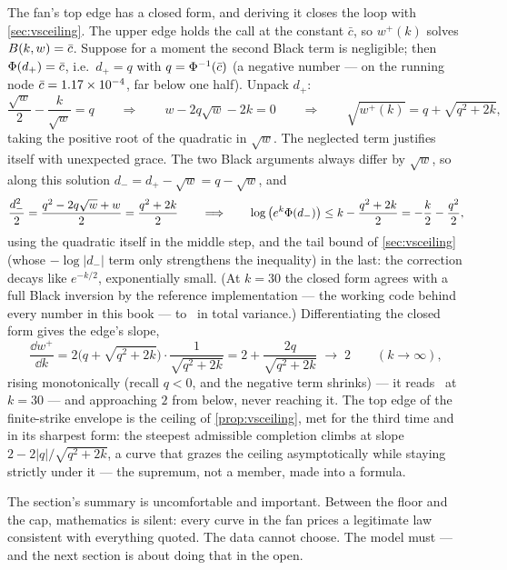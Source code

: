 The fan's top edge has a closed form, and deriving it closes the loop
with \cref{sec:vsceiling}.  The upper edge holds the call at the
constant $\bar c$, so $w^{+}(k)$ solves
$B(k,w)=\bar c$.  Suppose for a moment the second Black term is
negligible; then $\Phi(d_{+})=\bar c$, i.e.\
$d_{+}=q$ with $q=\Phi^{-1}(\bar c)$ (a negative number --- on the
running node $\bar c=1.17\times10^{-4}$, far below one half).  Unpack
$d_{+}$:
\[
\frac{\sqrt w}{2}-\frac{k}{\sqrt w}=q
\qquad\Longrightarrow\qquad
w-2q\sqrt w-2k=0
\qquad\Longrightarrow\qquad
\sqrt{w^{+}(k)}=q+\sqrt{q^{2}+2k},
\]
taking the positive root of the quadratic in $\sqrt w$.  The neglected
term justifies itself with unexpected grace.  The two Black arguments
always differ by $\sqrt w$, so along this solution
$d_{-}=d_{+}-\sqrt w=q-\sqrt{w}$, and
\[
\frac{d_{-}^{2}}{2}
=\frac{q^{2}-2q\sqrt w+w}{2}
=\frac{q^{2}+2k}{2}
\qquad\Longrightarrow\qquad
\log\big(e^{k}\Phi(d_{-})\big)
\le k-\frac{q^{2}+2k}{2}
=-\frac{k}{2}-\frac{q^{2}}{2},
\]
using the quadratic itself in the middle step, and the tail bound of
\cref{sec:vsceiling} (whose $-\log|d_{-}|$ term only strengthens the
inequality) in the last: the correction decays like $e^{-k/2}$,
exponentially small.  (At $k=30$ the closed form agrees with a full
Black inversion by the reference implementation --- the working code
behind every number in this book --- to \MacWingEnvTopAgree\ in
total variance.)  Differentiating the closed
form gives the edge's slope,
\begin{equation}
\frac{\dd w^{+}}{\dd k}
=2\big(q+\sqrt{q^{2}+2k}\big)\cdot\frac{1}{\sqrt{q^{2}+2k}}
=2+\frac{2q}{\sqrt{q^{2}+2k}}
\;\longrightarrow\;2
\qquad(k\to\infty),
\label{eq:vstopslope}
\end{equation}
rising monotonically (recall $q<0$, and the negative term shrinks) ---
it reads \MacWingEnvTopSlopeDeep\ at $k=30$ --- and approaching $2$
from below, never reaching it.  The top edge
of the finite-strike envelope is the ceiling of
\cref{prop:vsceiling}, met for the third time and in its sharpest
form: the steepest admissible completion climbs at slope
$2-2|q|/\sqrt{q^{2}+2k}$, a curve that grazes the ceiling
asymptotically while staying strictly under it --- the supremum, not
a member, made into a formula.

The section's summary is uncomfortable and important.  Between the
floor and the cap, mathematics is silent: every curve in the fan
prices a legitimate law consistent with everything quoted.  The data
cannot choose.  The model must --- and the next section is about
doing that in the open.
